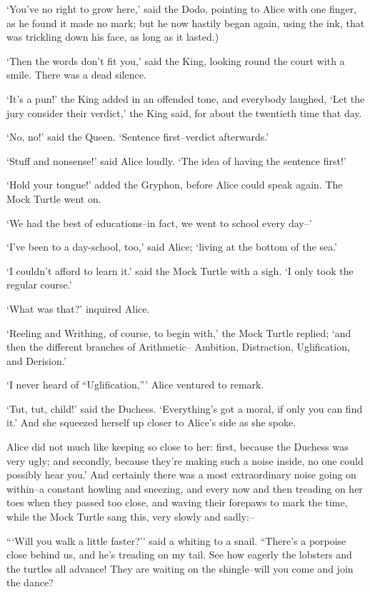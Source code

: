 \documentclass[statementpaper,twoside,openany]{memoir}
\begin{document}
`You've no right to grow here,' said the Dodo, pointing to Alice with one finger, as he found it made no mark; but he now hastily began again, using the ink, that was trickling down his face, as long as it lasted.)

`Then the words don't fit you,' said the King, looking round the court with a smile. There was a dead silence.

`It's a pun!' the King added in an offended tone, and everybody laughed, `Let the jury consider their verdict,' the King said, for about the twentieth time that day.

`No, no!' said the Queen. `Sentence first--verdict afterwards.'

`Stuff and nonsense!' said Alice loudly. `The idea of having the sentence first!'

`Hold your tongue!' added the Gryphon, before Alice could speak again. The Mock Turtle went on.

`We had the best of educations--in fact, we went to school every day--'

`I've been to a day-school, too,' said Alice; `living at the bottom of the sea.'

`I couldn't afford to learn it.' said the Mock Turtle with a sigh. `I only took the regular course.'

`What was that?' inquired Alice.

`Reeling and Writhing, of course, to begin with,' the Mock Turtle replied; `and then the different branches of Arithmetic-- Ambition, Distraction, Uglification, and Derision.'

`I never heard of ``Uglification,''' Alice ventured to remark.

`Tut, tut, child!' said the Duchess. `Everything's got a moral, if only you can find it.' And she squeezed herself up closer to Alice's side as she spoke.

Alice did not much like keeping so close to her: first, because the Duchess was very ugly; and secondly, because they're making such a noise inside, no one could possibly hear you.' And certainly there was a most extraordinary noise going on within--a constant howling and sneezing, and every now and then treading on her toes when they passed too close, and waving their forepaws to mark the time, while the Mock Turtle sang this, very slowly and sadly:--

```Will you walk a little faster?'' said a whiting to a snail. ``There's a porpoise close behind us, and he's treading on my tail. See how eagerly the lobsters and the turtles all advance! They are waiting on the shingle--will you come and join the dance?
\end{document}
